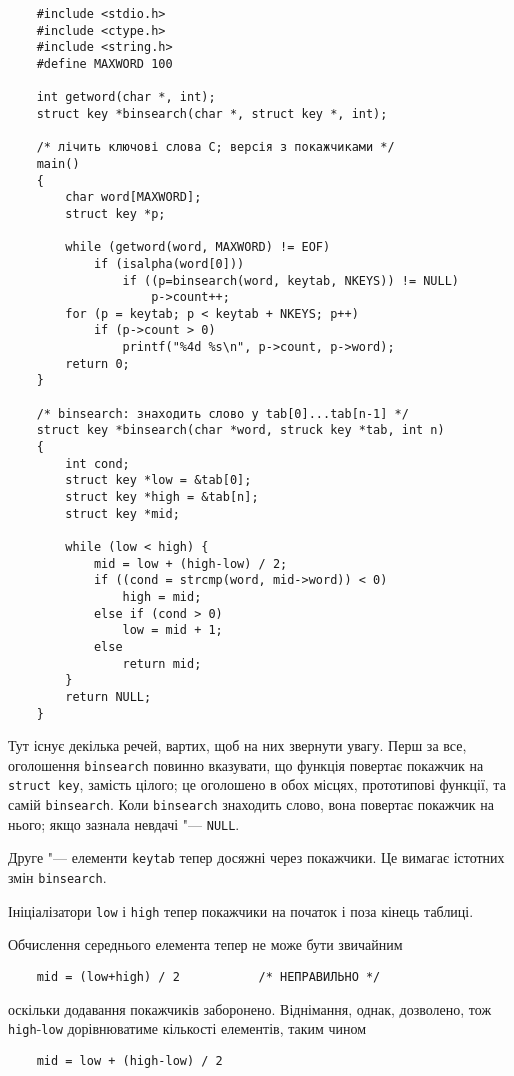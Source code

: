 \documentclass[a4paper,12pt]{book}
\begin{document}
  \begin{verbatim}
    #include <stdio.h>
    #include <ctype.h>
    #include <string.h>
    #define MAXWORD 100

    int getword(char *, int);
    struct key *binsearch(char *, struct key *, int);

    /* лічить ключові слова C; версія з покажчиками */
    main()
    {
        char word[MAXWORD];
        struct key *p;

        while (getword(word, MAXWORD) != EOF)
            if (isalpha(word[0]))
                if ((p=binsearch(word, keytab, NKEYS)) != NULL)
                    p->count++;
        for (p = keytab; p < keytab + NKEYS; p++)
            if (p->count > 0)
                printf("%4d %s\n", p->count, p->word);
        return 0;
    }

    /* binsearch: знаходить слово у tab[0]...tab[n-1] */
    struct key *binsearch(char *word, struck key *tab, int n)
    {
        int cond;
        struct key *low = &tab[0];
        struct key *high = &tab[n];
        struct key *mid;

        while (low < high) {
            mid = low + (high-low) / 2;
            if ((cond = strcmp(word, mid->word)) < 0)
                high = mid;
            else if (cond > 0)
                low = mid + 1;
            else
                return mid;
        }
        return NULL;
    }
  \end{verbatim}

  Тут існує декілька речей, вартих, щоб на них звернути увагу. Перш за все, оголошення
  \texttt{binsearch} повинно вказувати, що функція повертає покажчик на \texttt{struct
  key}, замість цілого; це оголошено в обох місцях, прототипові функції, та самій
  \texttt{binsearch}. Коли \texttt{binsearch} знаходить слово, вона повертає покажчик на
  нього; якщо зазнала невдачі "--- \texttt{NULL}.

  Друге "--- елементи \texttt{keytab} тепер досяжні через покажчики. Це вимагає
  істотних змін \texttt{binsearch}.

  Ініціалізатори \texttt{low} і \texttt{high} тепер покажчики на початок і поза кінець
  таблиці.

  Обчислення середнього елемента тепер не може бути звичайним
  \begin{verbatim}
    mid = (low+high) / 2           /* НЕПРАВИЛЬНО */
  \end{verbatim}

  оскільки додавання покажчиків заборонено. Віднімання, однак, дозволено, тож
  \texttt{high}-\texttt{low} дорівнюватиме кількості елементів, таким чином
  \begin{verbatim}
    mid = low + (high-low) / 2
  \end{verbatim}
\end{document}
